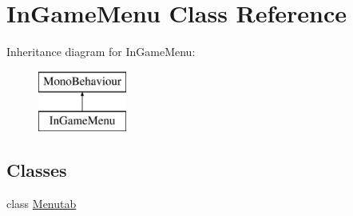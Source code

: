 \hypertarget{class_in_game_menu}{}\section{In\+Game\+Menu Class Reference}
\label{class_in_game_menu}
Inheritance diagram for In\+Game\+Menu\+:\begin{figure}[H]
\begin{center}
\leavevmode
\includegraphics[height=2.000000cm]{class_in_game_menu}
\end{center}
\end{figure}
\subsection*{Classes}
\begin{DoxyCompactItemize}
\item 
class \mbox{\hyperlink{class_in_game_menu_1_1_menutab}{Menutab}}
\end{DoxyCompactItemize}
